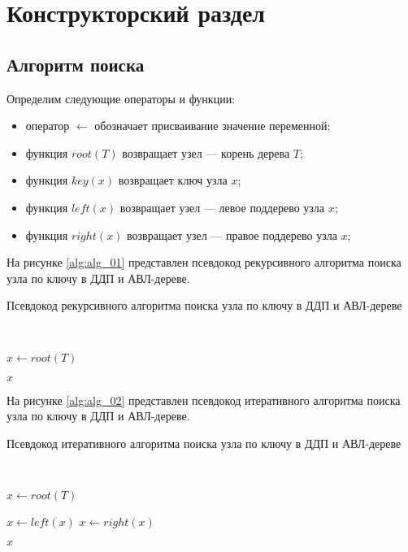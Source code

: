 \chapter{Конструкторский раздел}

\section{Алгоритм поиска}

Определим следующие операторы и функции:

\begin{itemize}[label*=--]
	\item оператор $\gets$ обозначает присваивание значение переменной;
	\item функция $root(T)$ возвращает узел --- корень дерева $T$;
	\item функция $key(x)$ возвращает ключ узла $x$;
	\item функция $left(x)$ возвращает узел --- левое поддерево узла $x$;
	\item функция $right(x)$ возвращает узел --- правое поддерево узла $x$;
\end{itemize}

На рисунке \ref{alg:alg_01} представлен псевдокод рекурсивного алгоритма поиска узла по ключу в ДДП и АВЛ-дереве.

\begin{algorithm}[H]
	\caption{Псевдокод рекурсивного алгоритма поиска узла по ключу в ДДП и АВЛ-дереве}
	\label{alg:alg_01}
	\\
	\begin{algorithmic}[1]
		\State $x \gets root(T)$
		
		\State \Return $x$
		\EndIf
		
		\State \Return {}
		\Else
		\State \Return {}
		\EndIf
		
		\EndFunction
	\end{algorithmic}
\end{algorithm}

На рисунке \ref{alg:alg_02} представлен псевдокод итеративного алгоритма поиска узла по ключу в ДДП и АВЛ-дереве.

\begin{algorithm}[H]
	\caption{Псевдокод итеративного алгоритма поиска узла по ключу в ДДП и АВЛ-дереве}
	\label{alg:alg_02}
	\\
	\begin{algorithmic}[1]
		\State $x \gets root(T)$
		
		\State $x \gets left(x)$
		\Else
		\State $x \gets right(x)$
		\EndIf
		\EndWhile
		
		\State \Return $x$
		
		\EndFunction
	\end{algorithmic}
\end{algorithm}


